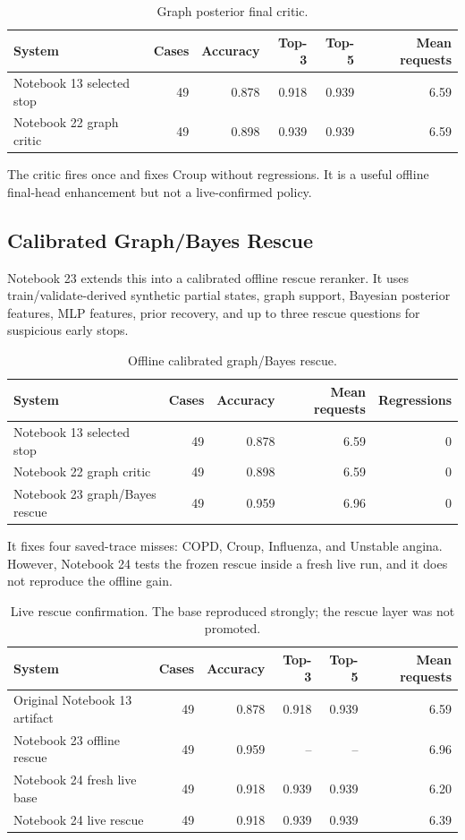 \documentclass[11pt]{article}
\newcommand{\mlp}{\textsc{MLP}}
\begin{document}
\begin{table}[H]
\centering
\caption{Graph posterior final critic.}
\begin{tabular}{lrrrrr}
\toprule
System & Cases & Accuracy & Top-3 & Top-5 & Mean requests \\
\midrule
Notebook 13 selected stop & 49 & 0.878 & 0.918 & 0.939 & 6.59 \\
Notebook 22 graph critic & 49 & 0.898 & 0.939 & 0.939 & 6.59 \\
\bottomrule
\end{tabular}
\end{table}

The critic fires once and fixes Croup without regressions. It is a useful offline final-head enhancement but not a live-confirmed policy.

\subsection{Calibrated Graph/Bayes Rescue}

Notebook 23 extends this into a calibrated offline rescue reranker. It uses train/validate-derived synthetic partial states, graph support, Bayesian posterior features, \mlp{} features, prior recovery, and up to three rescue questions for suspicious early stops.

\begin{table}[H]
\centering
\caption{Offline calibrated graph/Bayes rescue.}
\begin{tabular}{lrrrr}
\toprule
System & Cases & Accuracy & Mean requests & Regressions \\
\midrule
Notebook 13 selected stop & 49 & 0.878 & 6.59 & 0 \\
Notebook 22 graph critic & 49 & 0.898 & 6.59 & 0 \\
Notebook 23 graph/Bayes rescue & 49 & 0.959 & 6.96 & 0 \\
\bottomrule
\end{tabular}
\end{table}

It fixes four saved-trace misses: COPD, Croup, Influenza, and Unstable angina. However, Notebook 24 tests the frozen rescue inside a fresh live run, and it does not reproduce the offline gain.

\begin{table}[H]
\centering
\caption{Live rescue confirmation. The base reproduced strongly; the rescue layer was not promoted.}
\begin{tabular}{lrrrrr}
\toprule
System & Cases & Accuracy & Top-3 & Top-5 & Mean requests \\
\midrule
Original Notebook 13 artifact & 49 & 0.878 & 0.918 & 0.939 & 6.59 \\
Notebook 23 offline rescue & 49 & 0.959 & -- & -- & 6.96 \\
Notebook 24 fresh live base & 49 & 0.918 & 0.939 & 0.939 & 6.20 \\
Notebook 24 live rescue & 49 & 0.918 & 0.939 & 0.939 & 6.39 \\
\bottomrule
\end{tabular}
\end{table}
\end{document}
